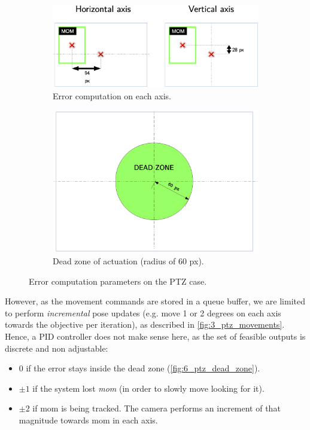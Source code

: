 	\begin{figure}[h]
		\centering
		\begin{subfigure}[b]{0.55\linewidth}
			\centering
			\includegraphics[width=3.6in]{images/ptz_error_comp}
			\caption{Error computation on each axis.}
			\label{fig:6_ptz_error}
		\end{subfigure}
		\hfill
		\begin{subfigure}[b]{0.5\linewidth}
			\centering
			\includegraphics[width=3.7in]{images/ptz_dead_zone}
			\caption{Dead zone of actuation (radius of 60 px).}
			\label{fig:6_ptz_dead_zone}
		\end{subfigure}
		\caption{Error computation parameters on the PTZ case.}
		\label{fig:6_ptz_parameters}
	\end{figure}
	
	However, as the movement commands are stored in a queue buffer, we are limited to perform \emph{incremental} pose updates (e.g. move 1 or 2 degrees on each axis towards the objective per iteration), as described in \autoref{fig:3_ptz_movements}. Hence, a PID controller does not make sense here, as the set of feasible outputs is discrete and non adjustable:
	\begin{itemize}
		\item $0$ if the error stays inside the dead zone (\autoref{fig:6_ptz_dead_zone}).
		
		\item $\pm 1$ if the system lost \emph{mom} (in order to slowly move looking for it).
		
		\item $\pm 2$ if mom is being tracked. The camera performs an increment of that magnitude towards mom in each axis.
	\end{itemize}
	

